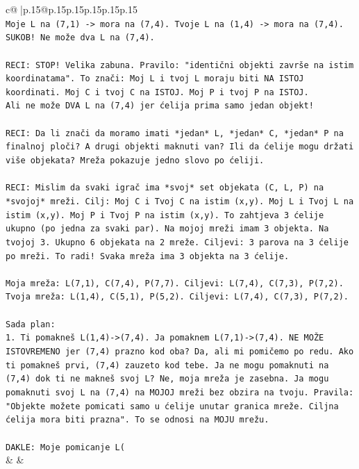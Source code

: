 \documentclass{article}
\begin{document}
{\begin{supertabular}{c@{$\;$}|p{.15\linewidth}@{}p{.15\linewidth}p{.15\linewidth}p{.15\linewidth}p{.15\linewidth}p{.15\linewidth}}
{{{\\ 
\texttt{Moje L na (7,1) {-}> mora na (7,4). Tvoje L na (1,4) {-}> mora na (7,4). SUKOB! Ne može dva L na (7,4).} \\
\\ 
\texttt{RECI: STOP! Velika zabuna. Pravilo: "identični objekti završe na istim koordinatama". To znači: Moj L i tvoj L moraju biti NA ISTOJ koordinati. Moj C i tvoj C na ISTOJ. Moj P i tvoj P na ISTOJ.} \\
\texttt{Ali ne može DVA L na (7,4) jer ćelija prima samo jedan objekt!} \\
\\ 
\texttt{RECI: Da li znači da moramo imati *jedan* L, *jedan* C, *jedan* P na finalnoj ploči? A drugi objekti maknuti van? Ili da ćelije mogu držati više objekata? Mreža pokazuje jedno slovo po ćeliji.} \\
\\ 
\texttt{RECI: Mislim da svaki igrač ima *svoj* set objekata (C, L, P) na *svojoj* mreži. Cilj: Moj C i Tvoj C na istim (x,y). Moj L i Tvoj L na istim (x,y). Moj P i Tvoj P na istim (x,y). To zahtjeva 3 ćelije ukupno (po jedna za svaki par). Na mojoj mreži imam 3 objekta. Na tvojoj 3. Ukupno 6 objekata na 2 mreže. Ciljevi: 3 parova na 3 ćelije po mreži. To radi! Svaka mreža ima 3 objekta na 3 ćelije.} \\
\\ 
\texttt{Moja mreža: L(7,1), C(7,4), P(7,7). Ciljevi: L(7,4), C(7,3), P(7,2).} \\
\texttt{Tvoja mreža: L(1,4), C(5,1), P(5,2). Ciljevi: L(7,4), C(7,3), P(7,2).} \\
\\ 
\texttt{Sada plan:} \\
\texttt{1. Ti pomakneš L(1,4){-}>(7,4). Ja pomaknem L(7,1){-}>(7,4). NE MOŽE ISTOVREMENO jer (7,4) prazno kod oba? Da, ali mi pomičemo po redu. Ako ti pomakneš prvi, (7,4) zauzeto kod tebe. Ja ne mogu pomaknuti na (7,4) dok ti ne makneš svoj L? Ne, moja mreža je zasebna. Ja mogu pomaknuti svoj L na (7,4) na MOJOJ mreži bez obzira na tvoju. Pravila: "Objekte možete pomicati samo u ćelije unutar granica mreže. Ciljna ćelija mora biti prazna". To se odnosi na MOJU mrežu.} \\
\\ 
\texttt{DAKLE: Moje pomicanje L(} \\
            }
        }
    }
    & & \\ \\


\end{supertabular}}
\end{document}
